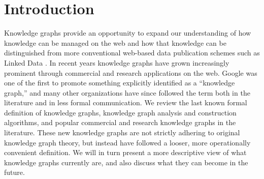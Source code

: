 \section{Introduction}


Knowledge graphs provide an opportunity to expand our understanding of how knowledge can be managed on the web and how that knowledge can be distinguished from more conventional web-based data publication schemes such as Linked Data \cite{bizer2009linked}.
In recent years knowledge graphs have grown increasingly prominent through commercial and research applications on the web.
Google was one of the first to promote something explicitly identified as a ``knowledge graph,'' \cite{singhal2012introducing} and many other organizations have since followed the term both in the literature and in less formal communication.
We review the last known formal definition of knowledge graphs, knowledge graph analysis and construction algorithms, and popular commercial and research knowledge graphs in the literature.
These new knowledge graphs are not strictly adhering to original knowledge graph theory, but instead have followed a looser, more operationally convenient definition.
We will in turn present a more descriptive view of what knowledge graphs currently are, and also discuss what they can become in the future.